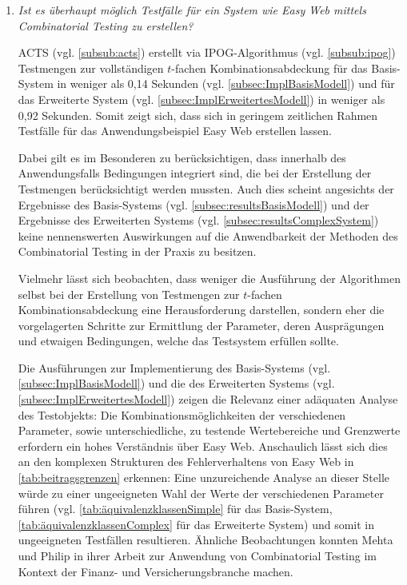 \begin{enumerate}
\item \textit{Ist es überhaupt möglich Testfälle für ein System wie Easy Web mittels Combinatorial Testing zu erstellen?}

ACTS (vgl. \autoref{subsub:acts}) erstellt via IPOG-Algorithmus (vgl. \autoref{subsub:ipog}) Testmengen zur vollständigen $t$-fachen Kombinationsabdeckung  für das Basis-System in weniger als 0,14 Sekunden (vgl. \autoref{subsec:ImplBasisModell}) und für das Erweiterte System (vgl. \autoref{subsec:ImplErweitertesModell}) in weniger als 0,92 Sekunden. Somit zeigt sich, dass sich in geringem zeitlichen Rahmen Testfälle für das Anwendungsbeispiel Easy Web erstellen lassen.

Dabei gilt es im Besonderen zu berücksichtigen, dass innerhalb des Anwendungsfalls Bedingungen integriert sind, die bei der Erstellung der Testmengen berücksichtigt werden mussten. Auch dies scheint angesichts der Ergebnisse des Basis-Systems (vgl. \autoref{subsec:resultsBasisModell}) und der Ergebnisse des Erweiterten Systems (vgl. \autoref{subsec:resultsComplexSystem}) keine nennenswerten Auswirkungen auf die Anwendbarkeit der Methoden des Combinatorial Testing in der Praxis zu besitzen.

Vielmehr lässt sich beobachten, dass weniger die Ausführung der Algorithmen selbst bei der Erstellung von Testmengen zur $t$-fachen Kombinationsabdeckung eine Herausforderung darstellen, sondern eher die vorgelagerten Schritte zur Ermittlung der Parameter, deren Ausprägungen und etwaigen Bedingungen, welche das Testsystem erfüllen sollte.

Die Ausführungen zur Implementierung des Basis-Systems (vgl. \autoref{subsec:ImplBasisModell}) und die des Erweiterten Systems (vgl. \autoref{subsec:ImplErweitertesModell}) zeigen die Relevanz einer adäquaten Analyse des Testobjekts: 
Die Kombinationsmöglichkeiten der verschiedenen Parameter, sowie unterschiedliche, zu testende Wertebereiche und Grenzwerte erfordern ein hohes Verständnis über Easy Web. Anschaulich lässt sich dies an den komplexen Strukturen des Fehlerverhaltens von Easy Web in \autoref{tab:beitragsgrenzen} erkennen: Eine unzureichende Analyse an dieser Stelle würde zu einer ungeeigneten Wahl der Werte der verschiedenen Parameter führen (vgl. \autoref{tab:äquivalenzklassenSimple} für das Basis-System, \autoref{tab:äquivalenzklassenComplex} für das Erweiterte System) und somit in ungeeigneten Testfällen resultieren. Ähnliche Beobachtungen konnten Mehta und Philip \cite{mehta2013applications} in ihrer Arbeit zur Anwendung von Combinatorial Testing im Kontext der Finanz- und Versicherungsbranche machen.



\end{enumerate}
